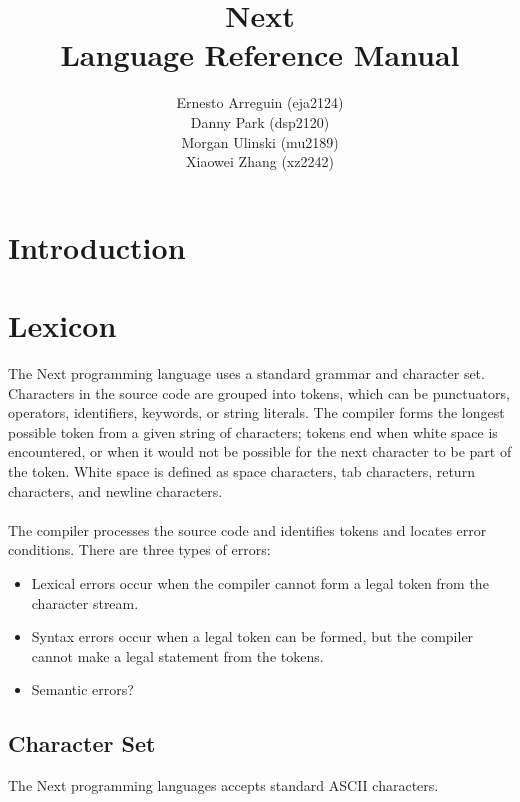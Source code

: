 \documentclass[12pt]{article}
\begin{document}
\title{\textbf{Next} \\ Language Reference Manual}
\author{Ernesto Arreguin (eja2124) \\Danny Park (dsp2120) \\Morgan Ulinski (mu2189) \\Xiaowei Zhang (xz2242)}
\date{}
\maketitle

\pagebreak

\tableofcontents

\section{Introduction}

\section{Lexicon}
The Next programming language uses a standard grammar and character set.  Characters in the source code are grouped into tokens, which can be punctuators, operators, identifiers, keywords, or string literals.  The compiler forms the longest possible token from a given string of characters; tokens end when white space is encountered, or when it would not be possible for the next character to be part of the token.  White space is defined as space characters, tab characters, return characters, and newline characters.
\\
\\
\noindent The compiler processes the source code and identifies tokens and locates error conditions.  There are three types of errors:
\begin{itemize}
\item Lexical errors occur when the compiler cannot form a legal token from the character stream.
\item Syntax errors occur when a legal token can be formed, but the compiler cannot make a legal statement from the tokens.
\item Semantic errors?
\end{itemize}

\subsection{Character Set}
The Next programming languages accepts standard ASCII characters.
\end{document}

